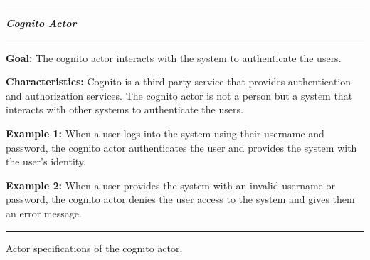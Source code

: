 \begin{table}[H]
    \noindent
    \rule{\textwidth}{0.4pt}

    \begin{center}
        \noindent
        \textit{\textbf{Cognito Actor}}
    \end{center}

    \noindent
    \rule{\textwidth}{0.4pt}
    \noindent

    \textbf{Goal:} The cognito actor interacts with the system to authenticate the users.
    \newline
    \noindent

    \textbf{Characteristics:} Cognito is a third-party service that provides authentication and authorization services.
    The cognito actor is not a person but a system that interacts with other systems to authenticate the users.
    \newline
    \noindent

    \textbf{Example 1:} When a user logs into the system using their username and password, the cognito actor
    authenticates the user and provides the system with the user's identity.
    \newline
    \noindent

    \textbf{Example 2:} When a user provides the system with an invalid username or password, the cognito actor
    denies the user access to the system and gives them an error message.

    \noindent
    \rule{\textwidth}{0.4pt}
    \caption{Actor specifications of the cognito actor.
    }\label{tab:actor-cognito}
\end{table}
